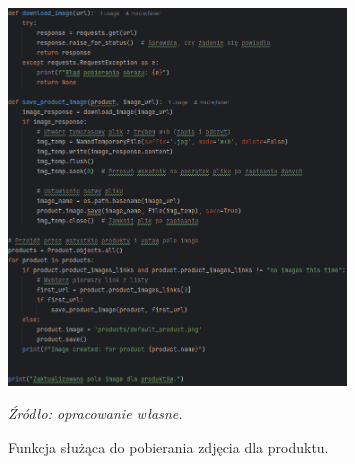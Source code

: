 \documentclass[12pt,a4paper,oneside]{article}
\theoremstyle{definition}
\numberwithin{equation}{section}
\begin{document}
\begin{figure}[H]
    \centering
    \includegraphics[width=0.8\textwidth]{images/krzysztofBImages/image_import.png}
    \caption{Funkcja służąca do pobierania zdjęcia dla produktu.}
    \emph{Źródło: opracowanie własne.}
    \label{fig:image_download}
\end{figure}
%
%
\end{document}
